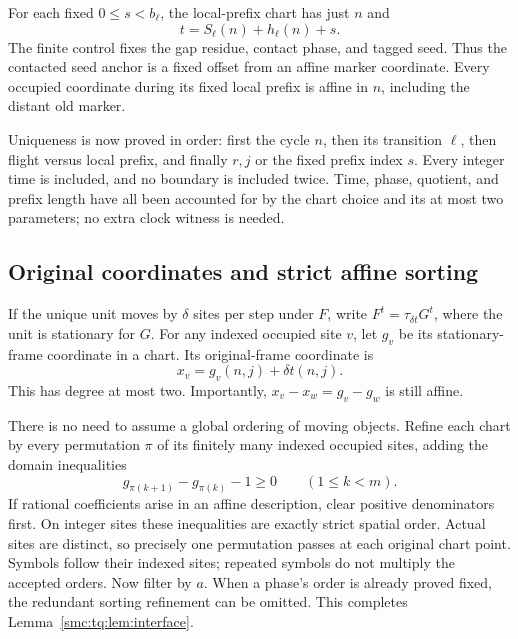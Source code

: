 \documentclass[11pt,letterpaper]{article}
\numberwithin{equation}{section}
\theoremstyle{definition}
\theoremstyle{remark}
\begin{document}
For each fixed $0\le s<b_\ell$, the local-prefix chart has just $n$ and
\[
 t=S_\ell(n)+h_\ell(n)+s.
\]
The finite control fixes the gap residue, contact phase, and tagged seed.
Thus the contacted seed anchor is a fixed offset from an affine marker
coordinate. Every occupied coordinate during its fixed local prefix is
affine in $n$, including the distant old marker.

Uniqueness is now proved in order: first the cycle $n$, then its transition
$\ell$, then flight versus local prefix, and finally $r,j$ or the fixed
prefix index $s$. Every integer time is included, and no boundary is
included twice. Time, phase, quotient, and prefix length have all been
accounted for by the chart choice and its at most two parameters; no extra
clock witness is needed.

\subsection{Original coordinates and strict affine sorting}
If the unique unit moves by $\delta$ sites per step under $F$, write
$F^t=\tau_{\delta t}G^t$, where the unit is stationary for $G$.
For any indexed occupied site $v$, let $g_v$ be its stationary-frame
coordinate in a chart. Its original-frame coordinate is
\begin{equation}\label{smc:tq:eq:frame}
 x_v=g_v(n,j)+\delta t(n,j).
\end{equation}
This has degree at most two. Importantly,
$x_v-x_w=g_v-g_w$ is still affine.

There is no need to assume a global ordering of moving objects. Refine each
chart by every permutation $\pi$ of its finitely many indexed occupied
sites, adding the domain inequalities
\begin{equation}\label{smc:tq:eq:sorting}
 g_{\pi(k+1)}-g_{\pi(k)}-1\ge0\qquad(1\le k<m).
\end{equation}
If rational coefficients arise in an affine description, clear positive
denominators first. On integer sites these inequalities are exactly strict
spatial order. Actual sites are distinct, so precisely one permutation
passes at each original chart point. Symbols follow their indexed sites;
repeated symbols do not multiply the accepted orders. Now filter by $a$.
When a phase's order is already proved fixed, the redundant sorting
refinement can be omitted. This completes Lemma~\ref{smc:tq:lem:interface}.
\end{document}
